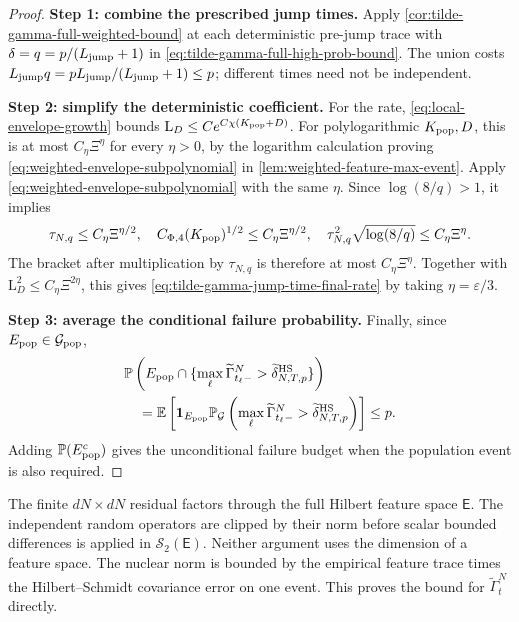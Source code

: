 \begin{proof}
\noindent\textbf{Step 1: combine the prescribed jump times.}
Apply \cref{cor:tilde-gamma-full-weighted-bound} at each deterministic
pre-jump trace with $\delta=q=p/(L_{\mathrm{jump}}+1)$ in
\eqref{eq:tilde-gamma-full-high-prob-bound}. The union costs
$L_{\mathrm{jump}} q=pL_{\mathrm{jump}}/(L_{\mathrm{jump}}+1)\le p$; different times need not be independent.

\par\noindent\textbf{Step 2: simplify the deterministic coefficient.}
For the rate, \eqref{eq:local-envelope-growth} bounds
$\mathrm L_D\le Ce^{C\chi(K_{\rm pop}+D)}$.
For polylogarithmic $K_{\rm pop},D$, this is at most
$C_\eta \Xi^\eta$ for every $\eta>0$, by the logarithm calculation proving
\eqref{eq:weighted-envelope-subpolynomial} in
\cref{lem:weighted-feature-max-event}. Apply
\eqref{eq:weighted-envelope-subpolynomial} with the same $\eta$.
Since $\log(8/q)>1$, it implies
\[
 \tau_{N,q}\le C_\eta \Xi^{\eta/2},\quad
 C_{\Phi,4}(K_{\rm pop})^{1/2}\le C_\eta \Xi^{\eta/2},\quad
 \tau_{N,q}^2\sqrt{\log(8/q)}\le C_\eta \Xi^\eta.
\]
The bracket after multiplication by $\tau_{N,q}$ is therefore at most
$C_\eta \Xi^\eta$. Together with $\mathrm L_D^2\le C_\eta \Xi^{2\eta}$,
this gives \eqref{eq:tilde-gamma-jump-time-final-rate} by taking
$\eta=\varepsilon/3$.

\par\noindent\textbf{Step 3: average the conditional failure probability.}
Finally, since $E_{\rm pop}\in\mathcal G_{\rm pop}$,
\[
\begin{aligned}
 &\mathbb P\left(E_{\rm pop}\cap
   \{\max_\ell\widetilde\Gamma_{t_\ell-}^N
                  >\widetilde\delta_{N,T,p}^{\rm HS}\}\right)\\
 &\quad=\mathbb E\left[\mathbf1_{E_{\rm pop}}
       \mathbb P_{\mathcal G}\left(
          \max_\ell\widetilde\Gamma_{t_\ell-}^N
                     >\widetilde\delta_{N,T,p}^{\rm HS}\right)\right]
 \le p.
\end{aligned}
\]
Adding $\mathbb P(E_{\rm pop}^c)$ gives the unconditional failure budget
when the population event is also required.
\end{proof}

\begin{remark}
\label{remark:tilde-gamma-no-rank-loss}
The finite $dN\times dN$ residual factors through the full Hilbert feature
space $\mathsf E$. The independent random operators are clipped by their
norm before scalar bounded differences is applied in $\mathcal S_2(\mathsf E)$.
Neither argument uses the dimension of a feature space. The nuclear norm
is bounded by the empirical feature trace times the Hilbert--Schmidt
covariance error on one event. This proves the bound for
$\widetilde\Gamma_t^N$ directly.
\end{remark}
